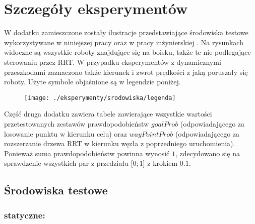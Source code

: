 \chapter[Szczegóły eksperymentów]{Szczegóły eksperymentów \label{sec:szczegoly_eksp}}
W dodatku zamieszczone zostały ilustracje przedstawiające środowiska testowe wykorzystywane w niniejszej pracy oraz w pracy inżynierskiej \cite{inzynierka}.
Na rysunkach widoczne są wszystkie roboty znajdujące się na boisku, także te nie podlegające sterowaniu przez RRT.
W przypadku eksperymentów z dynamicznymi przeszkodami zaznaczono także kierunek i zwrot prędkości z jaką poruszały się roboty.
Użyte symbole objaśnione są w legendzie poniżej.
	\begin{figure}[H]
	\centering
	\texttt{[image: ./eksperymenty/srodowiska/legenda]}
	\end{figure}	
Część druga dodatku zawiera tabele zawierające wszystkie wartości przetestowanych zestawów prawdopodobieństw $goalProb$ (odpowiadającego za losowanie punktu w kierunku celu) oraz
$wayPointProb$ (odpowiadającego za rozszerzanie drzewa RRT w kierunku węzła z poprzedniego uruchomienia).  
Ponieważ suma prawdopodobieństw powinna wynosić $1$, zdecydowano się na sprawdzenie wszystkich par z przedziału [$0;1$] z krokiem $0.1$. 
\section*{Środowiska testowe\label{sec:srodowiska_testowe}}
\subsection*{statyczne:}
	\begin{figure}[H]
	\centering	
	\hspace{0.5cm}
	    \\
	\hspace{0.5cm}
	  \\

	\end{figure}	

